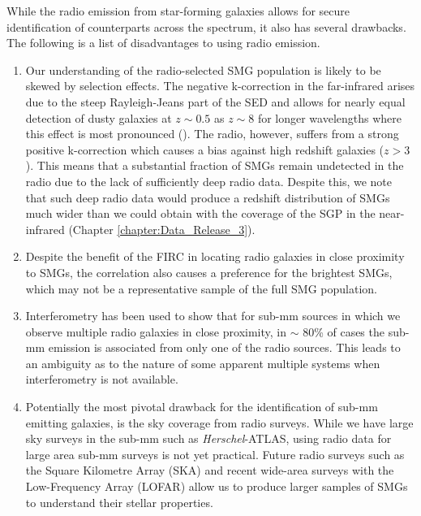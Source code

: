 While the radio emission from star-forming galaxies allows for secure identification of counterparts across the spectrum, it also has several drawbacks. The following is a list of disadvantages to using radio emission.

\begin{enumerate}
    \item Our understanding of the radio-selected SMG population is likely to be skewed by selection effects. The negative k-correction in the far-infrared arises due to the steep Rayleigh-Jeans part of the SED and allows for nearly equal detection of dusty galaxies at $z \sim 0.5$ as $z \sim 8$ for longer wavelengths where this effect is most pronounced (\citealt{Blain_2002}). The radio, however, suffers from a strong positive k-correction which causes a bias against high redshift galaxies ($z > 3$). This means that a substantial fraction of SMGs remain undetected in the radio due to the lack of sufficiently deep radio data. Despite this, we note that such deep radio data would produce a redshift distribution of SMGs much wider than we could obtain with the coverage of the SGP in the near-infrared (Chapter \ref{chapter:Data_Release_3}).
    \item Despite the benefit of the FIRC in locating radio galaxies in close proximity to SMGs, the correlation also causes a preference for the brightest SMGs, which may not be a representative sample of the full SMG population.
    \item Interferometry has been used to show that for sub-mm sources in which we observe multiple radio galaxies in close proximity, in $\sim$ 80\% of cases the sub-mm emission is associated from only one of the radio sources. This leads to an ambiguity as to the nature of some apparent multiple systems when interferometry is not available.
    \item Potentially the most pivotal drawback for the identification of sub-mm emitting galaxies, is the sky coverage from radio surveys. While we have large sky surveys in the sub-mm such as \textit{Herschel}-ATLAS, using radio data for large area sub-mm surveys is not yet practical. Future radio surveys such as the Square Kilometre Array (SKA) and recent wide-area surveys with the Low-Frequency Array (LOFAR) allow us to produce larger samples of SMGs to understand their stellar properties.
\end{enumerate}

